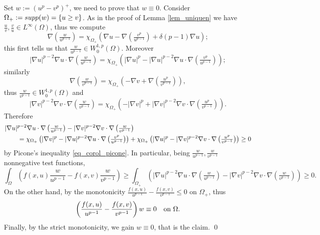\documentclass[10pt,a4paper]{amsart}
\renewenvironment{proof}[1][\proofname]{\medskip \noindent {\bfseries #1. }}{\qed \bigskip}
\begin{document}
\begin{proof}
Set $w:= (u^p-v^p)^+$, we need to prove that $w\equiv 0$. Consider $\Omega_+:= \textup{supp}(w)=\{u \geq v\}$.
As in the proof of Lemma \ref{lem_uniquen} we have $\frac{u}{v}, \frac{v}{u} \in L^{\infty}(\Omega)$,
thus we compute
$$\nabla \left(\tfrac{w}{u^{p-1}}\right) = \chi_{\Omega_+} \left( \nabla u - \nabla \left(\tfrac{v^p}{u^{p-1}}\right) + \delta (p-1) \nabla u\right);$$
this first tells us that $\frac{w}{u^{p-1}} \in W^{1,p}_0(\Omega)$. Moreover
$$|\nabla u|^{p-2} \nabla u \cdot \nabla \left(\tfrac{w}{u^{p-1}}\right) = \chi_{\Omega_+} \left( |\nabla u|^p - |\nabla u|^{p-2} \nabla u \cdot \nabla \left(\tfrac{v^p}{u^{p-1}}\right)\right);$$
similarly 
$$\nabla \left(\tfrac{w}{v^{p-1}}\right) = \chi_{\Omega_+} \left( -\nabla v + \nabla \left(\tfrac{u^p}{v^{p-1}}\right)\right),$$
thus $\frac{w}{v^{p-1}} \in W^{1,p}_0(\Omega)$ and
$$|\nabla v|^{p-2} \nabla v \cdot \nabla \left(\tfrac{w}{v^{p-1}}\right) = \chi_{\Omega_+} \left( - |\nabla v|^p + |\nabla v|^{p-2} \nabla v \cdot \nabla \left(\tfrac{u^p}{v^{p-1}}\right)\right).$$
Therefore
\begin{align*}
\MoveEqLeft |\nabla u|^{p-2} \nabla u \cdot \nabla \left(\tfrac{w}{u^{p-1}}\right) - |\nabla v|^{p-2} \nabla v \cdot \nabla \left(\tfrac{w}{v^{p-1}}\right) \\
& = \chi_{\Omega_+} \left( |\nabla v|^p - |\nabla u|^{p-2} \nabla u \cdot \nabla \left(\tfrac{v^p}{u^{p-1}}\right)\right)
+ \chi_{\Omega_+} \left( |\nabla u|^p - |\nabla v|^{p-2} \nabla v \cdot \nabla \left(\tfrac{u^p}{v^{p-1}}\right)\right) 
\geq 0
\end{align*}
by Picone's inequality \eqref{eq_corol_picone}. 
 In particular, being $\frac{w}{u^{p-1}}, \frac{w}{v^{p-1}}$ nonnegative test functions,
$$\int_{\Omega} \left( f(x,u) \frac{w}{u^{p-1}} - f(x,v) \frac{w}{v^{p-1}}\right) \geq \int_{\Omega_+} \left( |\nabla u|^{p-2} \nabla u \cdot \nabla \left(\tfrac{w}{u^{p-1}}\right) - |\nabla v|^{p-2} \nabla v \cdot \nabla \left(\tfrac{w}{v^{p-1}}\right) \right) \geq 0.$$
On the other hand, by the monotonicity $\frac{f(x,u)}{u^{p-1}} - \frac{f(x,v)}{v^{p-1}} \leq 0$ on $\Omega_+$, 
thus
$$ \left( \frac{f(x,u)}{u^{p-1}} - \frac{f(x,v)}{v^{p-1}}\right) w \equiv 0 \quad \hbox{on $\Omega$}.$$
Finally, by the strict monotonicity, we gain $w \equiv 0$, that is the claim.
\end{proof} 
\end{document}
